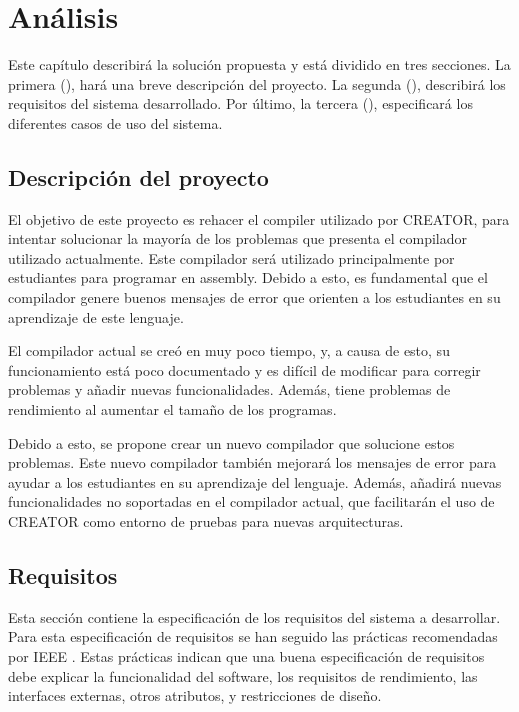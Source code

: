 \chapter{Análisis}\label{chap:analysis}

Este capítulo describirá la solución propuesta y está dividido en tres
secciones. La primera (), hará una breve descripción del
proyecto. La segunda (), describirá los requisitos del
sistema desarrollado. Por último, la tercera (),
especificará los diferentes casos de uso del sistema.

\section{Descripción del proyecto}\label{sec:description}

El objetivo de este proyecto es rehacer el \gls{compiler} utilizado por CREATOR,
para intentar solucionar la mayoría de los problemas que presenta el compilador
utilizado actualmente. Este compilador será utilizado principalmente por
estudiantes para programar en \gls{assembly}. Debido a esto, es fundamental que
el compilador genere buenos mensajes de error que orienten a los estudiantes en
su aprendizaje de este lenguaje.

El compilador actual se creó en muy poco tiempo, y, a causa de esto, su
funcionamiento está poco documentado y es difícil de modificar para corregir
problemas y añadir nuevas funcionalidades. Además, tiene problemas de
rendimiento al aumentar el tamaño de los programas.

Debido a esto, se propone crear un nuevo compilador que solucione estos
problemas. Este nuevo compilador también mejorará los mensajes de error para
ayudar a los estudiantes en su aprendizaje del lenguaje. Además, añadirá nuevas
funcionalidades no soportadas en el compilador actual, que facilitarán el uso de
CREATOR como entorno de pruebas para nuevas arquitecturas.

\section{Requisitos}\label{sec:requirements}

Esta sección contiene la especificación de los requisitos del sistema a
desarrollar. Para esta especificación de requisitos se han seguido las prácticas
recomendadas por IEEE \parencite{requirementsIEEE}. Estas prácticas indican que
una buena especificación de requisitos debe explicar la funcionalidad del
software, los requisitos de rendimiento, las interfaces externas, otros
atributos, y restricciones de diseño.

